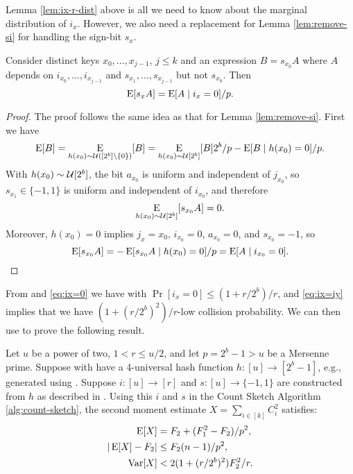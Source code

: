 Lemma \ref{lem:ix-r-dist} above is all we need to know about the
marginal distribution of $i_x$. However, we also need a replacement
for Lemma \ref{lem:remove-si} for handling the sign-bit $s_x$.
\begin{lemma}\label{lem:remove-si-r-dist} Consider distinct keys
   $x_0,\ldots,x_{j - 1}$, $j\leq k$ and an expression $B=s_{x_0}A$ where $A$
   depends on $i_{x_0},\ldots,i_{x_{j - 1}}$ and $s_{x_1},\ldots,s_{x_{j - 1}}$ but not
   $s_{x_0}$. 
   Then
   \begin{equation}\label{eq:remove-si-r-dist}
      \operatorname*{E}[s_xA]=\operatorname*{E}[A \mid i_x=0]/p.
   \end{equation}
\end{lemma}
\begin{proof}
   The proof follows the same idea as that for Lemma \ref{lem:remove-si}.
   First we have
   \[\operatorname*{E}[B]=\operatorname*{E}_{h(x_0) \sim \mathcal{U}([2^b]\setminus\{0\})}[B]=\operatorname*{E}_{h(x_0) \sim \mathcal{U}[2^b]}[B]2^b/p-\operatorname*{E}[B \mid h(x_0)=0]/p.\]
   With $h(x_0)\sim \mathcal{U}[2^b]$, the bit $a_{x_0}$ is uniform and 
   independent of $j_{x_0}$, so $s_{x_1}\in\{-1,1\}$ is uniform and 
   independent of $i_{x_0}$, and therefore 
   \[\operatorname*{E}_{h(x_0) \sim \mathcal{U}[2^b]}[s_{x_0}A]=0.\]
   Moreover, $h(x_0)=0$ implies $j_x={x_0}$, $i_{x_0}=0$, $a_{x_0}=0$,
   and $s_{x_0}=-1$,
   so 
   \[\operatorname*{E}[s_{x_0}A]=-\operatorname*{E}[s_{x_0}A \mid h(x_0)=0]/p=\operatorname*{E}[A \mid i_{x_0}=0].\]
\end{proof}

From  and \eqref{eq:ix=0} we have 
with $\Pr[i_x = 0] \le (1 + r/2^b)/r$, and \eqref{eq:ix=iy} implies that we have
$(1 + (r/2^b)^2)/r$-low collision probability. We can then use
 to prove the following result.
\begin{theorem}\label{thm:h-and-s-p-arb-r}
   Let $u$ be a power of two, $1 < r \le u/2$, and let $p=2^b-1>u$ be a
   Mersenne prime.
   Suppose with have a 4-universal hash function $h:[u]\to[2^b-1]$, e.g.,
   generated using . Suppose
   $i:[u]\to[r]$ and
   $s:[u]\to\{-1,1\}$ are constructed from $h$ as described in
   . Using this $i$ and $s$ 
   in the Count Sketch Algorithm \ref{alg:count-sketch}, the second moment 
   estimate $X=\sum_{i\in[k]} C_i^2$ satisfies:
   \begin{align}
      \operatorname*{E}[X] &= F_2+(F_1^2-F_2)/p^2, \label{eq:E-F2-p-arb-r}\\
      | \operatorname*{E}[X] - F_2 | &\le F_2 (n - 1)/p^2, \label{eq:E-F2-p-com-arb-r}\\
      \operatorname*{Var}[X]&< 2(1 + (r/2^b)^2)F_2^2/r.\label{eq:V-F2-p-arb-r}
   \end{align}
\end{theorem}

